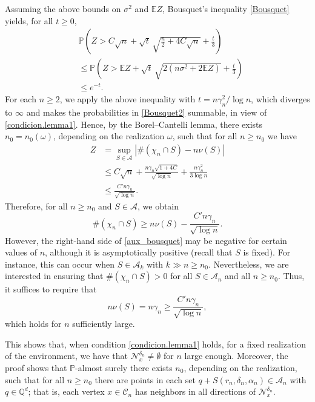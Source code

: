 \documentclass[11pt]{amsart}
\theoremstyle{definition}
\theoremstyle{remark}
\numberwithin{equation}{section}
\newcommand{\E}{\mathbb{E}}
\renewcommand{\P}{\mathbb{P}}
\newcommand{\C}{{\mathcal C}}
\newcommand{\Nc}{{\mathcal N}}
\begin{document}
Assuming the above bounds on $\sigma^2$ and $\E Z$, Bousquet's inequality \eqref{Bousquet} yields, for all $t \ge 0$,
\begin{align}
& \P\left(Z > C\sqrt{n} + \sqrt{t}\,\sqrt{\frac{n}{2} + 4C\sqrt{n}} + \frac{t}{3} \right)\\
&\le 
\P\left(Z > \E Z + \sqrt{t}\,\sqrt{2(n\sigma^2 + 2\E Z)} + \frac{t}{3}\right) \label{Bousquet2} \\
&\le 
e^{-t}. 
\end{align}
For each $n \ge 2$, we apply the above inequality with $t = n\gamma_n^2 / \log n$, which diverges to $\infty$ and makes the probabilities in \eqref{Bousquet2} summable, in view of \eqref{condicion.lemma1}. 
Hence, by the Borel–Cantelli lemma, there exists $n_0 = n_0(\omega)$, depending on the realization $\omega$, such that for all $n \ge n_0$ we have
\begin{equation}
\begin{array}{rl}
Z &
= 
\displaystyle \sup_{S\in \mathcal{A}} \left|\#(\chi_n \cap S) - n\nu(S)\right| \\
&
\displaystyle 
\le 
C\sqrt{n} + \frac{n\gamma_n\sqrt{1+4C}}{\sqrt{\log n}} + \frac{n\gamma_n^2}{3\log n} \\
&
\displaystyle 
\le 
\frac{C' n\gamma_n}{\sqrt{\log n}}.
\end{array}
\end{equation}
Therefore, for all $n \ge n_0$ and $S \in \mathcal{A}$, we obtain
\begin{equation}
\label{aux_bousquet}
\#(\chi_n \cap S)
\ge 
n\nu(S) - \frac{C' n\gamma_n}{\sqrt{\log n}}.
\end{equation}
However, the right-hand side of \eqref{aux_bousquet} may be negative for certain values of $n$, although it is asymptotically positive (recall that $S$ is fixed). 
For instance, this can occur when $S \in \mathcal{A}_k$ with $k \gg n \ge n_0$. 
Nevertheless, we are interested in ensuring that $\#(\chi_n \cap S) > 0$ for all $S \in \mathcal{A}_n$ and all $n \ge n_0$. 
Thus, it suffices to require that
\begin{equation}
n\nu(S) = n\gamma_n \ge \frac{C' n\gamma_n}{\sqrt{\log n}},
\end{equation}
which holds for $n$ sufficiently large.


This shows that, when condition \eqref{condicion.lemma1} holds, for a fixed realization of the environment, we have that $\Nc_x^{\delta_n} \neq \emptyset$ for $n$ large enough. 
Moreover, the proof shows that $\P$-almost surely there exists $n_0$, depending on the realization, such that for all $n \ge n_0$ there are points in each set $q + S(r_n,\delta_n,\alpha_n) \in \mathcal{A}_n$ with $q \in \mathbb{Q}^d$; that is, each vertex $x \in \C_n$ has neighbors in all directions of $\Nc_x^{\delta_n}$.
\end{document}
